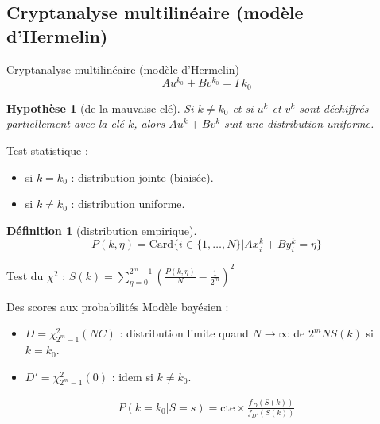 \documentclass{beamer}
\newtheorem*{hypo}{Hypothèse}
\newtheorem*{defi}{Définition}
\begin{document}
\subsection{Cryptanalyse multilinéaire (modèle d'Hermelin)}
\begin{frame}{Cryptanalyse multilinéaire (modèle d'Hermelin)}
$$Au^{k_0}+Bv^{k_0}=\Gamma k_0$$

\begin{hypo}[de la mauvaise clé]
	Si $k\neq k_0$ et si $u^{k}$ et $v^{k}$ sont déchiffrés partiellement avec la clé $k$, alors
$Au^{k}+Bv^{k}$ suit une distribution uniforme.
\end{hypo}

Test statistique :
	\begin{itemize}
		\item si $k=k_0$ : distribution jointe (biaisée).
		\item si $k\neq k_0$ : distribution uniforme.
	\end{itemize}

\begin{defi}[distribution empirique]
$$P(k,\eta)=\text{Card}\{i\in\{1,\ldots,N\} | Ax_i^k+By_i^k=\eta\}$$
\end{defi}

Test du $\chi^2$ : $S(k)=\sum_{\eta=0}^{2^m-1} \left(\frac{P(k,\eta)}{N}-\frac{1}{2^m}\right)^2$
\end{frame}

\begin{frame}{Des scores aux probabilités}
Modèle bayésien :

	\begin{itemize}
		\item $D=\chi^2_{2^m-1}(NC)$ : distribution limite quand $N\to\infty$ de $2^mNS(k)$ si $k=k_0$.
		\item $D'=\chi^2_{2^m-1}(0)$ : idem si $k\neq k_0$.
	\end{itemize}


\begin{align*}
	P(k=k_0|S=s)=\text{cte}\times \frac{f_D(S(k))}{f_{D'}(S(k))}
\end{align*}


\end{frame}
\end{document}
